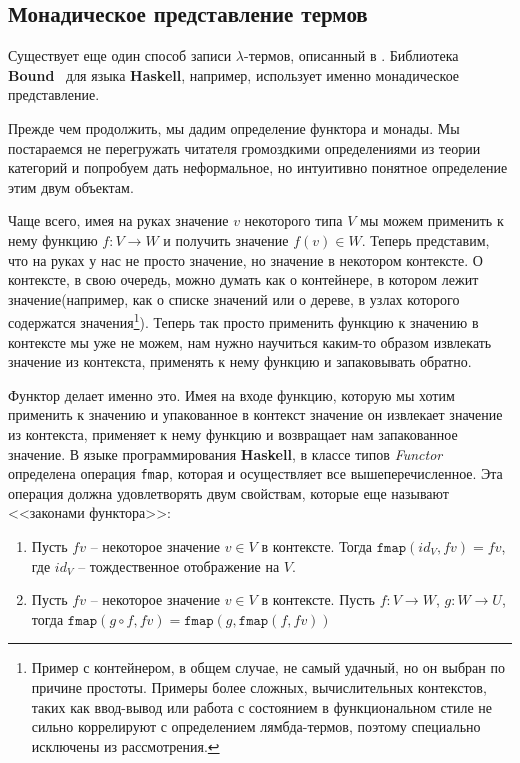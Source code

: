 \subsection{Монадическое представление термов}
\label{sec:monad}
Существует еще один способ записи $\lambda$-термов, описанный в \cite{bird1999bruijn}. Библиотека \textbf{Bound}~\cite{bound} для языка \textbf{Haskell}, например, использует именно монадическое представление.

Прежде чем продолжить, мы дадим определение функтора и монады. Мы постараемся не перегружать читателя громоздкими определениями из теории категорий и попробуем дать неформальное, но интуитивно понятное определение этим двум объектам.

Чаще всего, имея на руках значение $v$ некоторого типа $V$ мы можем применить к нему функцию $f : V \to W$ и получить значение $f(v) \in W$. Теперь представим, что на руках у нас не просто значение, но значение в некотором контексте. О контексте, в свою очередь, можно думать как о контейнере, в котором лежит значение(например, как о списке значений или о дереве, в узлах которого содержатся значения\footnote{Пример с контейнером, в общем случае, не самый удачный, но он выбран по причине простоты. Примеры более сложных, вычислительных контекстов, таких как ввод-вывод или работа с состоянием в функциональном стиле не сильно коррелируют с определением лямбда-термов, поэтому специально исключены из рассмотрения.}). Теперь так просто применить функцию к значению в контексте мы уже не можем, нам нужно научиться каким-то образом извлекать значение из контекста, применять к нему функцию и запаковывать обратно.

Функтор делает именно это. Имея на входе функцию, которую мы хотим применить к значению и упакованное в контекст значение он извлекает значение из контекста, применяет к нему функцию и возвращает нам запакованное значение. В языке программирования \textbf{Haskell}, в классе типов \textit{Functor} определена операция \texttt{fmap}, которая и осуществляет все вышеперечисленное. Эта операция должна удовлетворять двум свойствам, которые еще называют <<законами функтора>>:

\begin{enumerate}
  \item Пусть $fv$ -- некоторое значение $v \in V$ в контексте. Тогда $\texttt{fmap}(id_{V}, fv) = fv$, где $id_{V}$ -- тождественное отображение на $V$.
  \item Пусть $fv$ -- некоторое значение $v \in V$ в контексте. Пусть $f : V \to W$, $g : W \to U$, тогда $\texttt{fmap}(g \circ f, fv) = \texttt{fmap}(g, \texttt{fmap}(f, fv))$
\end{enumerate}

